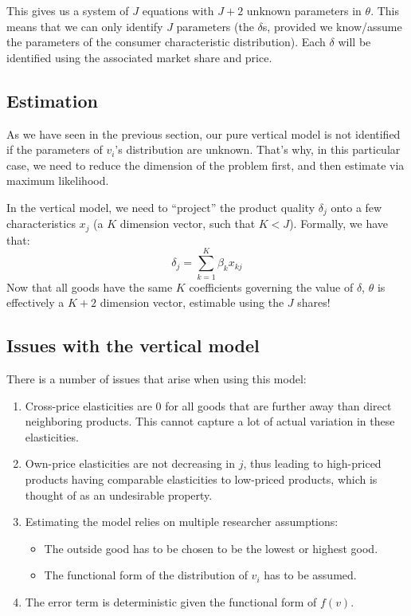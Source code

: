 This gives us a system of $J$ equations with $J+2$ unknown parameters in $\theta$. This means that we can only identify $J$ parameters (the $\delta$s, provided we know/assume the parameters of the consumer characteristic distribution). Each $\delta$ will be identified using the associated market share and price.

\subsection{Estimation}

As we have seen in the previous section, our pure vertical model is not identified if the parameters of $v_i$'s distribution are unknown. That's why, in this particular case, we need to reduce the dimension of the problem first, and then estimate via maximum likelihood.

In the vertical model, we need to ``project'' the product quality $\delta_j$ onto a few characteristics $x_j$ (a $K$ dimension vector, such that $K < J$). Formally, we have that: $$ \delta_j = \sum_{k=1}^{K} \beta_k x_{kj} $$ Now that all goods have the same $K$ coefficients governing the value of $\delta$, $\theta$ is effectively a $K+2$ dimension vector, estimable using the $J$ shares!

\subsection{Issues with the vertical model}

There is a number of issues that arise when using this model:\begin{enumerate}
\item Cross-price elasticities are 0 for all goods that are further away than direct neighboring products. This cannot capture a lot of actual variation in these elasticities.
\item Own-price elasticities are not decreasing in $j$, thus leading to high-priced products having comparable elasticities to low-priced products, which is thought of as an undesirable property.
\item Estimating the model relies on multiple researcher assumptions:\begin{itemize}
\item The outside good has to be chosen to be the lowest or highest good.
\item The functional form of the distribution of $v_i$ has to be assumed.
\end{itemize}
\item The error term is deterministic given the functional form of $f(v)$.
\end{enumerate}


